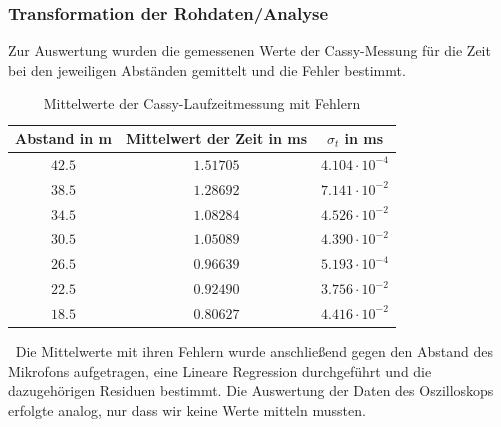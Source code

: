 \documentclass[12pt,a4paper]{article}
\begin{document}
\subsubsection{Transformation der Rohdaten/Analyse}
Zur Auswertung wurden die gemessenen Werte der Cassy-Messung für die Zeit bei den jeweiligen Abständen gemittelt und die Fehler bestimmt.
\begin{table}[H]\centering
\caption{Mittelwerte der Cassy-Laufzeitmessung mit Fehlern}
\begin{tabular}{c|c|c}
Abstand in m & Mittelwert der Zeit in ms & $\sigma_t$ in ms\\ 
\hline
$42.5$& $1.51705$& $4.104 \cdot 10^{-4}$\\ 
$38.5$& $1.28692$& $7.141 \cdot 10^{-2}$\\
$34.5$& $1.08284$& $4.526 \cdot 10^{-2}$\\
$30.5$& $1.05089$& $4.390 \cdot 10^{-2}$\\
$26.5$& $0.96639$& $5.193 \cdot 10^{-4}$\\
$22.5$& $0.92490$& $3.756 \cdot 10^{-2}$\\
$18.5$& $0.80627$& $4.416 \cdot 10^{-2}$\\
\end{tabular} 
\end{table}
$~$\newline
Die Mittelwerte mit ihren Fehlern wurde anschließend gegen den Abstand des Mikrofons aufgetragen, eine Lineare Regression durchgeführt und die dazugehörigen Residuen bestimmt.
\newline
Die Auswertung der Daten des Oszilloskops erfolgte analog, nur dass wir keine Werte mitteln mussten.
\end{document}
